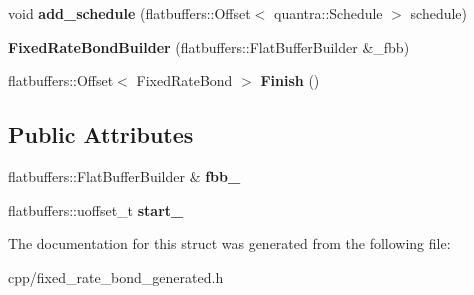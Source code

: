 \begin{DoxyCompactItemize}
void {\bfseries add\+\_\+schedule} (flatbuffers\+::\+Offset$<$ quantra\+::\+Schedule $>$ schedule)
\item 
\mbox{\label{structquantra_1_1FixedRateBondBuilder_ab42c8ed7506f27dcf1386847896ec820}} 
{\bfseries Fixed\+Rate\+Bond\+Builder} (flatbuffers\+::\+Flat\+Buffer\+Builder \&\+\_\+fbb)
\item 
\mbox{\label{structquantra_1_1FixedRateBondBuilder_ae85230c991f80c7f823d165e4b580c8c}} 
flatbuffers\+::\+Offset$<$ Fixed\+Rate\+Bond $>$ {\bfseries Finish} ()
\end{DoxyCompactItemize}
\subsection*{Public Attributes}
\begin{DoxyCompactItemize}
\item 
\mbox{\label{structquantra_1_1FixedRateBondBuilder_adb447783e457b0c1759503279580bee4}} 
flatbuffers\+::\+Flat\+Buffer\+Builder \& {\bfseries fbb\+\_\+}
\item 
\mbox{\label{structquantra_1_1FixedRateBondBuilder_af16f5e546a6bca9e8699cbdf3069b89c}} 
flatbuffers\+::uoffset\+\_\+t {\bfseries start\+\_\+}
\end{DoxyCompactItemize}


The documentation for this struct was generated from the following file\+:\begin{DoxyCompactItemize}
\item 
cpp/fixed\+\_\+rate\+\_\+bond\+\_\+generated.\+h\end{DoxyCompactItemize}
